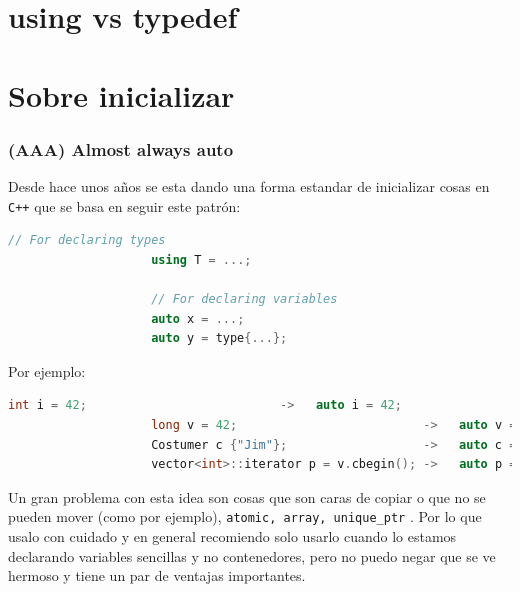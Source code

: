 \documentclass[12pt, fleqn]{report}                             %
\theoremstyle{break}                                            %
\newcommand{\textCode}[1]  { \texttt{#1} }                      %
\newcommand{\Cpp}{\ignorespaces\textCode{C++}}                  %
\begin{document}
        \clearpage
        \section{using vs typedef}  


        \clearpage
        \section{Sobre inicializar}  

            \subsubsection{(AAA) Almost always auto}

                Desde hace unos años se esta dando una forma estandar de inicializar cosas en \Cpp
                que se basa en seguir este patrón:
                \begin{lstlisting}[language=C++, gobble=20]
                    // For declaring types
                    using T = ...;

                    // For declaring variables
                    auto x = ...;
                    auto y = type{...};
                \end{lstlisting}

                Por ejemplo:
                \begin{lstlisting}[language=C++, gobble=20]
                    int i = 42;                           ->   auto i = 42;
                    long v = 42;                          ->   auto v = long {42};
                    Costumer c {"Jim"};                   ->   auto c = Costumer {"Jim"};
                    vector<int>::iterator p = v.cbegin(); ->   auto p = v.cbegin();
                \end{lstlisting}

                Un gran problema con esta idea son cosas que son caras de copiar o que no se pueden mover
                (como por ejemplo), \textCode{atomic, array, unique\_ptr}. Por lo que usalo con cuidado
                y en general recomiendo solo usarlo cuando lo estamos declarando variables sencillas y no 
                contenedores, pero no puedo negar que se ve hermoso y tiene un par de ventajas importantes.
\end{document}
